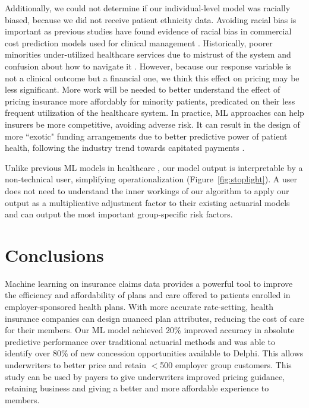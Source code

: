 \documentclass[letterpaper]{article} %
\begin{document}
Additionally, we could not determine if our individual-level model was racially biased, because we did not receive patient ethnicity data.  Avoiding racial bias is important as previous studies have found evidence of racial bias in commercial cost prediction models used for clinical management \cite{RacialBias}.  Historically, poorer minorities under-utilized healthcare services due to mistrust of the system and confusion about how to navigate it \cite{RacialBias}. However, because our response variable is not a clinical outcome but a financial one, we think this effect on pricing may be less significant.  More work will be needed to better understand the effect of pricing insurance more affordably for minority patients, predicated on their less frequent utilization of the healthcare system.  In practice, ML approaches can help insurers be more competitive, avoiding adverse risk. It can result in the design of more ``exotic" funding arrangements due to better predictive power of patient health, following the industry trend towards capitated payments \cite{mngdcare}.

Unlike previous ML models in healthcare \cite{xai}, our model output is interpretable by a non-technical user, simplifying operationalization (Figure~\ref{fig:stoplight}). A user does not need to understand the inner workings of our algorithm to apply our output as a multiplicative adjustment factor to their existing actuarial models and can output the most important group-specific risk factors.

\vspace{-1.79mm}
\section*{Conclusions}
Machine learning on insurance claims data provides a powerful tool to improve the efficiency and affordability of plans and care offered to patients enrolled in employer-sponsored health plans. With more accurate rate-setting, health insurance companies can design nuanced plan attributes, reducing the cost of care for their members. Our ML model achieved 20\% improved accuracy in absolute predictive performance over traditional actuarial methods and was able to identify over 80\% of new concession opportunities available to Delphi. This allows underwriters to better price and retain $<$500 employer group customers. This study can be used by payers to give underwriters improved pricing guidance, retaining business and giving a better and more affordable experience to members.
\end{document}

